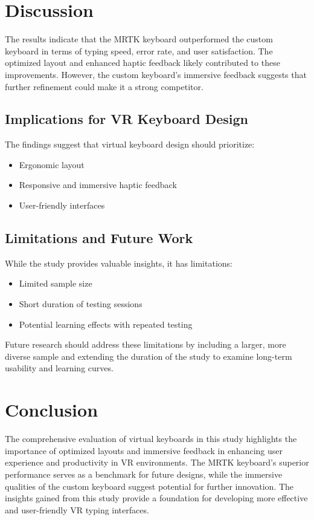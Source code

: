 \section{Discussion}
The results indicate that the MRTK keyboard outperformed the custom keyboard in terms of typing speed, error rate, and user satisfaction. The optimized layout and enhanced haptic feedback likely contributed to these improvements. However, the custom keyboard's immersive feedback suggests that further refinement could make it a strong competitor.

\subsection{Implications for VR Keyboard Design}
The findings suggest that virtual keyboard design should prioritize:
\begin{itemize}
    \item Ergonomic layout
    \item Responsive and immersive haptic feedback
    \item User-friendly interfaces
\end{itemize}

\subsection{Limitations and Future Work}
While the study provides valuable insights, it has limitations:
\begin{itemize}
    \item Limited sample size
    \item Short duration of testing sessions
    \item Potential learning effects with repeated testing
\end{itemize}
Future research should address these limitations by including a larger, more diverse sample and extending the duration of the study to examine long-term usability and learning curves.

\section{Conclusion}
The comprehensive evaluation of virtual keyboards in this study highlights the importance of optimized layouts and immersive feedback in enhancing user experience and productivity in VR environments. The MRTK keyboard's superior performance serves as a benchmark for future designs, while the immersive qualities of the custom keyboard suggest potential for further innovation. The insights gained from this study provide a foundation for developing more effective and user-friendly VR typing interfaces.
